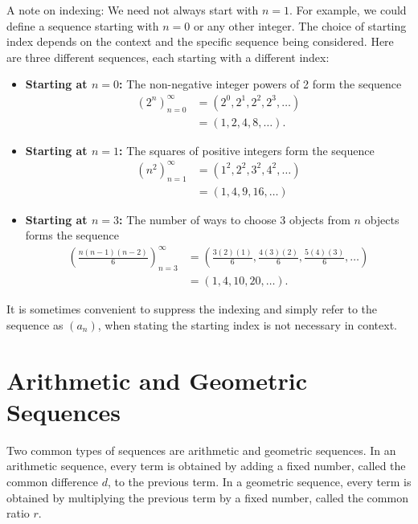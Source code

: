 \documentclass{article}
\begin{document}
A note on indexing: We need not always start with \(n=1\). For example, we could define a sequence starting with \(n=0\) or any other integer. The choice of starting index depends on the context and the specific sequence being considered. Here are three different sequences, each starting with a different index:
\begin{itemize}
    \item \textbf{Starting at \(n=0\):} The non-negative integer powers of 2 form the sequence
    \begin{align*}
    (2^n)_{n=0}^\infty &= (2^0, 2^1, 2^2, 2^3, \ldots) \\
    &= (1, 2, 4, 8, \ldots).
    \end{align*}
    \item \textbf{Starting at \(n=1\):} The squares of positive integers form the sequence
    \begin{align*}
    (n^2)_{n=1}^\infty &= (1^2, 2^2, 3^2, 4^2, \ldots) \\
    &= (1, 4, 9, 16, \ldots)
    \end{align*}
    \item \textbf{Starting at \(n=3\):} The number of ways to choose 3 objects from \(n\) objects forms the sequence
    \begin{align*}
    \left(\frac{n(n-1)(n-2)}{6}\right)_{n=3}^\infty &= \left(\frac{3(2)(1)}{6}, \frac{4(3)(2)}{6}, \frac{5(4)(3)}{6}, \ldots\right) \\
    &= (1, 4, 10, 20, \ldots).
    \end{align*}
\end{itemize}
It is sometimes convenient to suppress the indexing and simply refer to the sequence as \((a_n)\), when stating the starting index is not necessary in context.


\section{Arithmetic and Geometric Sequences}\label{sec:arith-geom-sequences}

Two common types of sequences are arithmetic and geometric sequences. In an arithmetic sequence, every term is obtained by adding a fixed number, called the common difference \(d\), to the previous term. In a geometric sequence, every term is obtained by multiplying the previous term by a fixed number, called the common ratio \(r\).
\end{document}
